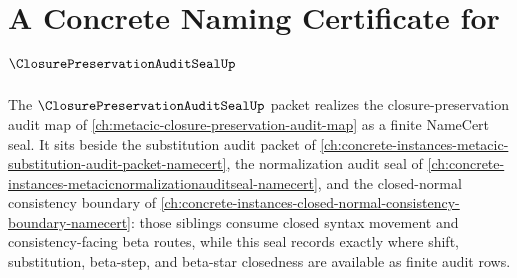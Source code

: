 \chapter{A Concrete Naming Certificate for $\ClosurePreservationAuditSealUp$}
\label{ch:concrete-instances-closure-preservation-audit-seal-namecert}

The $\ClosurePreservationAuditSealUp$ packet realizes the closure-preservation audit map of \autoref{ch:metacic-closure-preservation-audit-map} as a finite NameCert seal. It sits beside the substitution audit packet of \autoref{ch:concrete-instances-metacic-substitution-audit-packet-namecert}, the normalization audit seal of \autoref{ch:concrete-instances-metacicnormalizationauditseal-namecert}, and the closed-normal consistency boundary of \autoref{ch:concrete-instances-closed-normal-consistency-boundary-namecert}: those siblings consume closed syntax movement and consistency-facing beta routes, while this seal records exactly where shift, substitution, beta-step, and beta-star closedness are available as finite audit rows.

